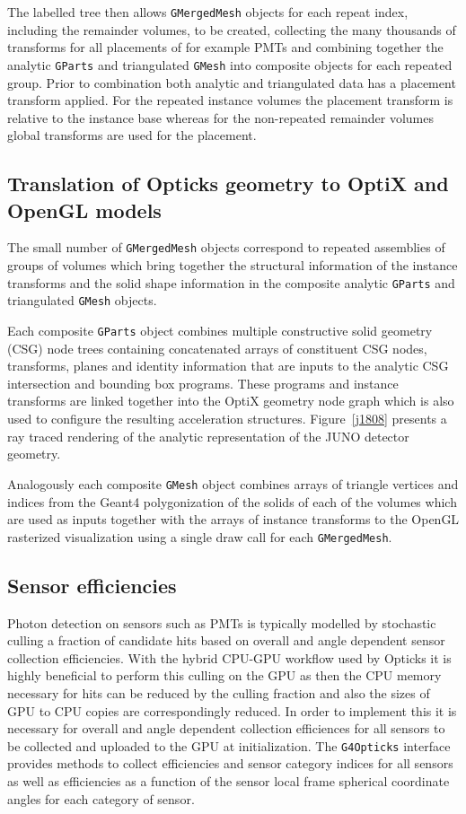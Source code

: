 \documentclass{webofc}
\begin{document}
The labelled tree then allows {\tt GMergedMesh} objects for each repeat index, including the remainder volumes, 
to be created, collecting the many thousands of transforms for all placements of for example PMTs and 
combining together the analytic {\tt GParts} and triangulated {\tt GMesh} into composite objects for
each repeated group. Prior to combination both analytic and triangulated data has a
placement transform applied. For the repeated instance volumes the placement 
transform is relative to the instance base whereas for the non-repeated remainder volumes global 
transforms are used for the placement.
%
\subsection{Translation of Opticks geometry to OptiX and OpenGL models}%
%
The small number of {\tt GMergedMesh} objects correspond to repeated assemblies of groups of volumes
which bring together the structural information of the instance transforms and the solid shape information 
in the composite analytic {\tt GParts} and triangulated {\tt GMesh} objects.

Each composite {\tt GParts} object combines multiple constructive solid geometry (CSG) node trees
containing concatenated arrays of constituent CSG nodes, transforms, planes and identity information
that are inputs to the analytic CSG intersection and bounding box programs. These programs 
and instance transforms are linked together into the OptiX geometry node graph which is also 
used to configure the resulting acceleration structures. 
Figure~\ref{j1808} presents a ray traced rendering of the analytic representation of the JUNO detector geometry. 

Analogously each composite {\tt GMesh} object combines arrays of triangle vertices and indices from 
the Geant4 polygonization of the solids of each of the volumes which are used as inputs together with 
the arrays of instance transforms to the OpenGL rasterized visualization using a single draw call for each {\tt GMergedMesh}.
%
\subsection{Sensor efficiencies}%
%
Photon detection on sensors such as PMTs is typically modelled by stochastic culling a fraction of 
candidate hits based on overall and angle dependent sensor collection efficiencies. 
With the hybrid CPU-GPU workflow used by Opticks it is highly beneficial to perform this culling 
on the GPU as then the CPU memory necessary for hits can be reduced by the culling fraction and also the sizes of 
GPU to CPU copies are correspondingly reduced. In order to implement this it is necessary for overall and 
angle dependent collection efficiences for all sensors to be collected and uploaded to the GPU at 
initialization. The {\tt G4Opticks} interface provides methods to collect efficiencies and sensor category indices 
for all sensors as well as efficiencies as a function of the sensor local frame spherical coordinate angles 
for each category of sensor. 
\end{document}
